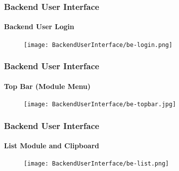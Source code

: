 
\begin{frame}[fragile]
	\frametitle{Backend User Interface}
	\framesubtitle{Backend User Login}

	\begin{figure}
		\texttt{[image: BackendUserInterface/be-login.png]}
	\end{figure}

\end{frame}


\begin{frame}[fragile]
	\frametitle{Backend User Interface}
	\framesubtitle{Top Bar (Module Menu)}

	\begin{figure}
		\texttt{[image: BackendUserInterface/be-topbar.jpg]}
	\end{figure}

\end{frame}


\begin{frame}[fragile]
	\frametitle{Backend User Interface}
	\framesubtitle{List Module and Clipboard}

	\begin{figure}
		\texttt{[image: BackendUserInterface/be-list.png]}
	\end{figure}

\end{frame}

